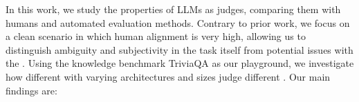 % 
In this work, we study the properties of LLMs as judges, comparing them with humans and automated evaluation methods.
Contrary to prior work, we focus on a clean scenario in which human alignment is very high, 
allowing us to distinguish ambiguity and subjectivity in the task itself from potential issues with the \judgemodels.
Using the knowledge benchmark TriviaQA \citep{joshi2017triviaqa} as our playground, we investigate how \njudgesword different \textit{\judgemodels} with varying architectures and sizes judge \nexamtakersword different \textit{\evaluatormodels}.
    Our main findings are:
